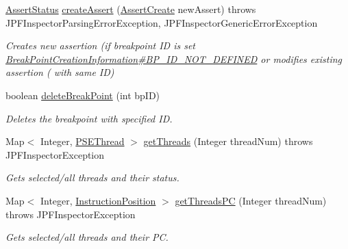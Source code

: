\begin{DoxyCompactItemize}
\hyperlink{interfacegov_1_1nasa_1_1jpf_1_1inspector_1_1interfaces_1_1_assert_status}{Assert\+Status} \hyperlink{interfacegov_1_1nasa_1_1jpf_1_1inspector_1_1interfaces_1_1_break_point_manager_interface_a835295e3e429bd405ba3acec21f5193e}{create\+Assert} (\hyperlink{interfacegov_1_1nasa_1_1jpf_1_1inspector_1_1interfaces_1_1_assert_create}{Assert\+Create} new\+Assert)  throws J\+P\+F\+Inspector\+Parsing\+Error\+Exception, J\+P\+F\+Inspector\+Generic\+Error\+Exception
\begin{DoxyCompactList}\small\item\em Creates new assertion (if breakpoint ID is set \hyperlink{interfacegov_1_1nasa_1_1jpf_1_1inspector_1_1interfaces_1_1_break_point_creation_information_a24626231e3744e59f505d0731d4ca9e1}{Break\+Point\+Creation\+Information\#\+B\+P\+\_\+\+I\+D\+\_\+\+N\+O\+T\+\_\+\+D\+E\+F\+I\+N\+ED} or modifies existing assertion ( with same ID) \end{DoxyCompactList}\item 
boolean \hyperlink{interfacegov_1_1nasa_1_1jpf_1_1inspector_1_1interfaces_1_1_break_point_manager_interface_a1b117659c4230581c31e5c5448675bcd}{delete\+Break\+Point} (int bp\+ID)
\begin{DoxyCompactList}\small\item\em Deletes the breakpoint with specified ID. \end{DoxyCompactList}\item 
Map$<$ Integer, \hyperlink{classgov_1_1nasa_1_1jpf_1_1inspector_1_1common_1_1pse_1_1_p_s_e_thread}{P\+S\+E\+Thread} $>$ \hyperlink{interfacegov_1_1nasa_1_1jpf_1_1inspector_1_1interfaces_1_1_program_state_interface_a54531453dd2373d8f9f166a79547495a}{get\+Threads} (Integer thread\+Num)  throws J\+P\+F\+Inspector\+Exception
\begin{DoxyCompactList}\small\item\em Gets selected/all threads and their status. \end{DoxyCompactList}\item 
Map$<$ Integer, \hyperlink{interfacegov_1_1nasa_1_1jpf_1_1inspector_1_1interfaces_1_1_instruction_position}{Instruction\+Position} $>$ \hyperlink{interfacegov_1_1nasa_1_1jpf_1_1inspector_1_1interfaces_1_1_program_state_interface_a4ca30deeab5ba91a9ee285aabbdb623a}{get\+Threads\+PC} (Integer thread\+Num)  throws J\+P\+F\+Inspector\+Exception
\begin{DoxyCompactList}\small\item\em Gets selected/all threads and their PC. \end{DoxyCompactList}\item 

\end{DoxyCompactItemize}
